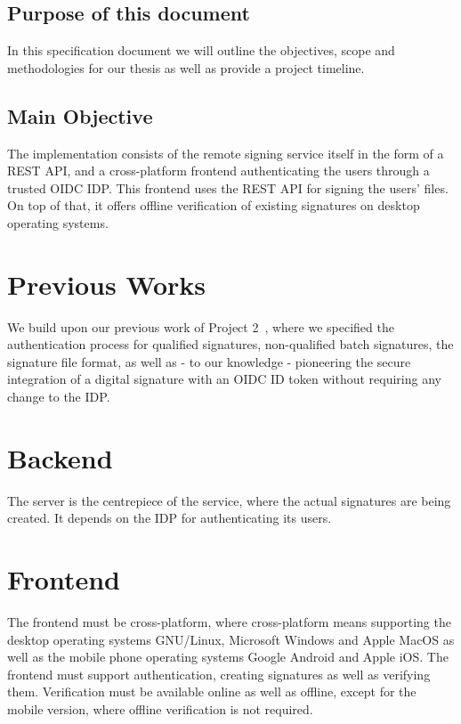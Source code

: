 \subsection{Purpose of this document}

In this specification document we will outline the objectives, scope and methodologies for our thesis as well as provide a project timeline.

\subsection{Main Objective}
The implementation consists of the remote signing service itself in the form of a \gls{REST} \gls{API},
and a cross-platform frontend authenticating the users through a trusted \gls{OIDC} \gls{IDP}.
This frontend uses the \gls{REST} \gls{API} for signing the users' files.
On top of that, it offers offline verification of existing signatures on desktop operating systems.

\section{Previous Works}
\label{section:previousworks}

We build upon our previous work of Project 2~\cite{projekt2}, where we specified the authentication process
for qualified signatures, non-qualified batch signatures, the signature file format,
as well as - to our knowledge - pioneering the secure integration of a digital signature with an \gls{OIDC} ID token without requiring any change to the \gls{IDP}.

\section{Backend}
\label{section:backend}

The server is the centrepiece of the service, where the actual signatures are being created.
It depends on the \gls{IDP} for authenticating its users.

\section{Frontend}
\label{section:frontend}

The frontend must be cross-platform, where cross-platform means supporting the desktop operating systems
GNU/Linux, Microsoft Windows and Apple MacOS as well as the mobile phone operating systems Google Android and Apple iOS.
The frontend must support authentication, creating signatures as well as verifying them.
Verification must be available online as well as offline, except for the mobile version, where offline verification is not required.

